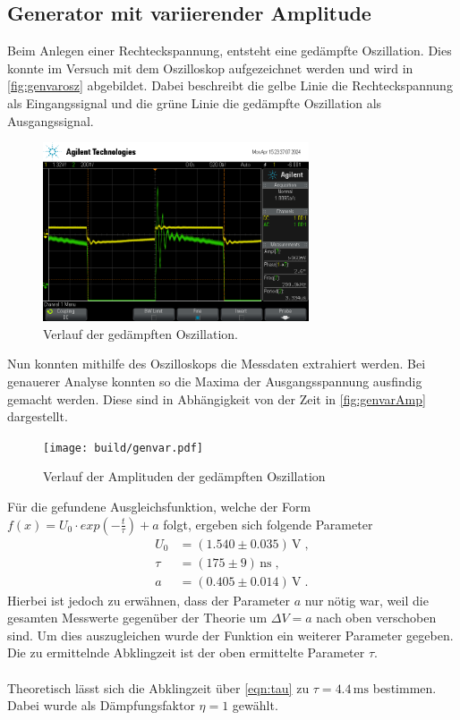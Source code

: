 \subsection{Generator mit variierender Amplitude}
Beim Anlegen einer Rechteckspannung, entsteht eine gedämpfte Oszillation. Dies konnte im Versuch mit dem Oszilloskop aufgezeichnet werden und 
wird  in \autoref{fig:genvarosz} abgebildet. Dabei beschreibt die gelbe Linie die Rechteckspannung als Eingangssignal und die grüne Linie 
die gedämpfte Oszillation als Ausgangssignal.
\begin{figure}
    \centering
    \includegraphics[width=0.7\textwidth]{genvarplot.png}
    \caption{Verlauf der gedämpften Oszillation.}
    \label{fig:genvarosz}
\end{figure}
Nun konnten mithilfe des Oszilloskops die Messdaten extrahiert werden. Bei genauerer Analyse konnten so die Maxima der Ausgangsspannung 
ausfindig gemacht werden. Diese sind in Abhängigkeit von der Zeit in \autoref{fig:genvarAmp} dargestellt.
\begin{figure}
    \centering
    \texttt{[image: build/genvar.pdf]}
    \caption{Verlauf der Amplituden der gedämpften Oszillation}
    \label{fig:genvarAmp}
\end{figure}
Für die gefundene Ausgleichsfunktion, welche der Form $f(x)= U_0\cdot exp(-\frac{t}{\tau})+a$ folgt, ergeben sich folgende Parameter
\begin{align*}
    U_0&= (1.540\pm 0.035) \, \unit{\volt}\;,\\
    \tau&= (175\pm 9)\, \unit{\nano \second}\;,\\
    a&= (0.405\pm 0.014) \, \unit{\volt}\; .
\end{align*}
Hierbei ist jedoch zu erwähnen, dass der Parameter $a$ nur nötig war, weil die gesamten Messwerte gegenüber der Theorie um $\Delta V= a$ nach oben verschoben sind.
Um dies auszugleichen wurde der Funktion ein weiterer Parameter gegeben.
Die zu ermittelnde Abklingzeit ist der oben ermittelte Parameter $\tau$. \\
\\
Theoretisch lässt sich die Abklingzeit über \autoref{eqn:tau} zu $\tau = 4.4 \,\unit{\milli\second}$ bestimmen. Dabei wurde als 
Dämpfungsfaktor $\eta = 1$ gewählt.